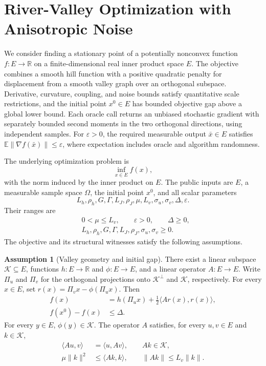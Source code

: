 \documentclass[10pt]{article}
\theoremstyle{definition}
\newtheorem{assumption}{Assumption}
\begin{document}
\section*{River-Valley Optimization with Anisotropic Noise}
We consider finding a stationary point of a potentially nonconvex function $f:E\to\mathbb{R}$ on a finite-dimensional real inner product space $E$. The objective combines a smooth hill function with a positive quadratic penalty for displacement from a smooth valley graph over an orthogonal subspace. Derivative, curvature, coupling, and noise bounds satisfy quantitative scale restrictions, and the initial point $x^0\in E$ has bounded objective gap above a global lower bound. Each oracle call returns an unbiased stochastic gradient with separately bounded second moments in the two orthogonal directions, using independent samples. For $\varepsilon>0$, the required measurable output $\bar{x}\in E$ satisfies $\mathbb{E}\|\nabla f(\bar{x})\|\leq\varepsilon$, where expectation includes oracle and algorithm randomness.

The underlying optimization problem is
\[
\inf_{x\in E} f(x),
\]
with the norm induced by the inner product on $E$. The public inputs are $E$, a measurable sample space $\Omega$, the initial point $x^0$, and all scalar parameters
\[
L_h,\rho_h,G,\Gamma,L_J,\rho_J,\mu,L_v,
\sigma_u,\sigma_v,\Delta,\varepsilon.
\]
Their ranges are
\[
\begin{aligned}
&0<\mu\leq L_v,\qquad \varepsilon>0,\qquad \Delta\geq0,\\
&L_h,\rho_h,G,\Gamma,L_J,\rho_J,\sigma_u,\sigma_v\geq0.
\end{aligned}
\]
The objective and its structural witnesses satisfy the following assumptions.

\begin{assumption}[Valley geometry and initial gap]
There exist a linear subspace $\mathcal{K}\subseteq E$, functions $h:E\to\mathbb{R}$ and $\phi:E\to E$, and a linear operator $A:E\to E$. Write $\Pi_u$ and $\Pi_v$ for the orthogonal projections onto $\mathcal{K}^{\perp}$ and $\mathcal{K}$, respectively. For every $x\in E$, set $r(x)=\Pi_vx-\phi(\Pi_ux)$. Then
\[
\begin{aligned}
f(x)&=h(\Pi_ux)+\tfrac12\langle Ar(x),r(x)\rangle,\\
f(x^0)-f(x)&\leq\Delta.
\end{aligned}
\]
For every $y\in E$, $\phi(y)\in\mathcal{K}$. The operator $A$ satisfies, for every $u,v\in E$ and $k\in\mathcal{K}$,
\[
\begin{aligned}
\langle Au,v\rangle&=\langle u,Av\rangle,\qquad Ak\in\mathcal{K},\\
\mu\|k\|^2&\leq\langle Ak,k\rangle,\qquad
\|Ak\|\leq L_v\|k\|.
\end{aligned}
\]
\end{assumption}
\end{document}
